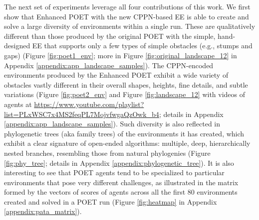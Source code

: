 \documentclass{article}
\newcommand{\ks}[1]{\comments{\textcolor{purple}{[Ken: #1]}}}
\newcommand{\rwang}[1]{\comments{\textcolor{blue}{[Rui: #1]}}}
\newcommand{\removed}[1]{\comments{\textcolor{gray}{\sout{#1}}}}
\newcommand{\comments}[1]{#1} %
\begin{document}
The next set of experiments leverage all four contributions of this work. We first show that Enhanced POET with the new CPPN-based EE is able to create and solve a large diversity of environments within a single run. These are qualitatively different than those produced by the original POET with the simple, hand-designed EE that supports only a few types of simple obstacles (e.g., stumps and gaps) (Figure \ref{fig:poet1_env}; more in Figure \ref{fig:original_landscape_12} in Appendix \ref{appendix:app_landscape_samples}). The CPPN-encoded environments produced by the Enhanced POET exhibit a wide variety of obstacles vastly different in their overall shapes, heights, fine details, and subtle variations (Figure \ref{fig:poet2_env} and Figure \ref{fig:landscape_12} with videos of agents at \url{https://www.youtube.com/playlist?list=PLxWSC7x4MS2feqPL7MojvfwgaQzOwk_b4}; details in Appendix \ref{appendix:app_landscape_samples}). Such diversity is also reflected in phylogenetic trees (aka family trees) of the environments it has created, which exhibit a clear signature of open-ended algorithms: multiple, deep, hierarchically nested branches, resembling those from natural phylogenies (Figure \ref{fig:phy_tree}; details in Appendix \ref{appendix:phylogenetic_tree}). It is also interesting to see that POET agents tend to be specialized to particular environments that pose very different challenges, as illustrated in the matrix formed by the vectors of scores of agents across all the first 80 environments created and solved in a POET run (Figure \ref{fig:heatmap} in Appendix \ref{appendix:pata_matrix}). %
\end{document}
